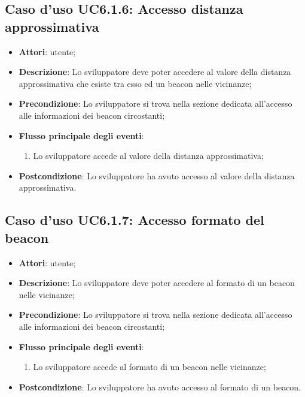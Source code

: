 \documentclass[../AnalisiDeiRequisiti.tex]{subfiles}
\begin{document}
\subsection{Caso d'uso UC6.1.6: Accesso distanza approssimativa}
\begin{itemize}
\item \textbf{Attori}: utente;
\item \textbf{Descrizione}: Lo sviluppatore deve poter accedere al valore della distanza approssimativa che esiste tra esso ed un beacon nelle vicinanze; 
      \item \textbf{Precondizione}: Lo sviluppatore si trova nella sezione dedicata all'accesso alle informazioni dei beacon circostanti;

        \item \textbf{Flusso principale degli eventi}:
          \begin{enumerate}
          \item Lo sviluppatore accede al valore della distanza approssimativa;

      \end{enumerate}
    \item \textbf{Postcondizione}: Lo sviluppatore ha avuto accesso al valore della distanza approssimativa.
  \end{itemize}
\hypertarget{UC6.1.7}{}
\subsection{Caso d'uso UC6.1.7: Accesso formato del beacon}

\begin{itemize}
\item \textbf{Attori}: utente;
\item \textbf{Descrizione}: Lo sviluppatore deve poter accedere al formato di un beacon nelle vicinanze; 
      \item \textbf{Precondizione}: Lo sviluppatore si trova nella sezione dedicata all'accesso alle informazioni dei beacon circostanti;

        \item \textbf{Flusso principale degli eventi}:
          \begin{enumerate}
          \item Lo sviluppatore accede al formato di un beacon nelle vicinanze;

      \end{enumerate}
    \item \textbf{Postcondizione}: Lo sviluppatore ha avuto accesso al formato di un beacon.
  \end{itemize}
\hypertarget{UC6.1.8}{}
\end{document}
